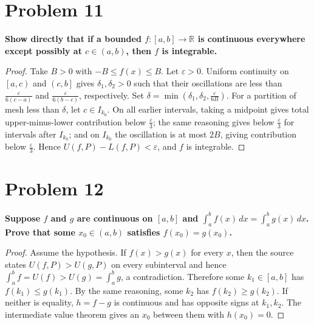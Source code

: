 \section{Problem 11}

\textbf{Show directly that if a bounded \(f:\left\lbrack {a,b} \right\rbrack\rightarrow\mathbb{R}\) is continuous everywhere except possibly at \(c \in \left( {a,b} \right)\), then \(f\) is integrable.}

\begin{proof}

Take \(B > 0\) with \(- B \leq f(x) \leq B\). Let \(\varepsilon > 0\). Uniform continuity on \(\left\lbrack {a,c} \right)\) and \(\left( {c,b} \right\rbrack\) gives \(\delta_{1},\delta_{2} > 0\) such that their oscillations are less than \(\frac{\varepsilon}{6\left( {c - a} \right)}\) and \(\frac{\varepsilon}{6\left( {b - c} \right)}\), respectively. Set \(\delta = \min\left( {\delta_{1},\delta_{2},\frac{\varepsilon}{6B}} \right)\). For a partition of mesh less than \(\delta\), let \(c \in I_{k_{0}}\). On all earlier intervals, taking a midpoint gives total upper-minus-lower contribution below \(\frac{\varepsilon}{3}\); the same reasoning gives below \(\frac{\varepsilon}{3}\) for intervals after \(I_{k_{0}}\); and on \(I_{k_{0}}\) the oscillation is at most \(2B\), giving contribution below \(\frac{\varepsilon}{3}\). Hence \(U\left( {f,P} \right) - L\left( {f,P} \right) < \varepsilon\), and \(f\) is integrable.

\end{proof}

\section{Problem 12}

\textbf{Suppose \(f\) and \(g\) are continuous on \(\left\lbrack {a,b} \right\rbrack\) and \(\int_{a}^{b}f(x)\, dx = \int_{a}^{b}g(x)\, dx\). Prove that some \(x_{0} \in \left( {a,b} \right)\) satisfies \(f\left( x_{0} \right) = g\left( x_{0} \right)\).}

\begin{proof}

Assume the hypothesis. If \(f(x) > g(x)\) for every \(x\), then the source states \(U\left( {f,P} \right) > U\left( {g,P} \right)\) on every subinterval and hence \(\int_{a}^{b}f = U(f) > U(g) = \int_{a}^{b}g\), a contradiction. Therefore some \(k_{1} \in \left\lbrack {a,b} \right\rbrack\) has \(f\left( k_{1} \right) \leq g\left( k_{1} \right)\). By the same reasoning, some \(k_{2}\) has \(f\left( k_{2} \right) \geq g\left( k_{2} \right)\). If neither is equality, \(h = f - g\) is continuous and has opposite signs at \(k_{1},k_{2}\). The intermediate value theorem gives an \(x_{0}\) between them with \(h\left( x_{0} \right) = 0\).

\end{proof}

